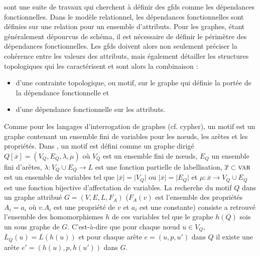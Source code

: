 \cite{fanKeysGraphs2015,fanFunctionalDependenciesGraphs2016, fanDependenciesGraphs2019} sont une suite de travaux qui cherchent à définir des \glspl{gfd} comme les dépendances fonctionnelles.
Dans le modèle relationnel, les dépendances fonctionnelles sont définies sur une relation pour un ensemble d'attributs.
Pour les graphes, étant généralement dépourvus de schéma, il est nécessaire de définir le périmètre des dépendances fonctionnelles.
Les \glspl{gfd} doivent alors non seulement préciser la cohérence entre les valeurs des attributs, mais également détailler les structures topologiques qui les caractérisent et sont alors la combinaison :
\begin{itemize}
    \item d'une contrainte topologique, ou motif, sur le graphe qui définie la portée de la dépendance fonctionnelle et
    \item d'une dépendance fonctionnelle sur les attributs.
\end{itemize}

Comme pour les langages d'interrogation de graphes (cf. \gls{cypher}), un motif est un graphe contenant un ensemble fini de variables pour les nœuds, les arêtes et les propriétés.
Dans \cite{fanDependenciesGraphs2019}, un motif est défini comme un graphe dirigé $Q[\overline{x}] = (V_Q, E_Q, \lambda, \mu)$ où $V_Q$ est un ensemble fini de nœuds, $E_Q$ un ensemble fini d'arêtes, $\lambda : V_Q \cup E_Q \to L$ est une fonction partielle de labellisation, $\overline{x} \subset \textsc{var}$ est un ensemble de variables tel que $\lvert \overline{x} \rvert = \lvert V_Q \rvert$ ou $\lvert \overline{x} \rvert = \lvert E_Q \rvert$ et $\mu : \overline{x} \to V_Q \cup E_Q$ est une fonction bijective d'affectation de variables.
La recherche du motif $Q$ dans un graphe attribué $G = (V, E, L, F_A)$ ($F_A(v)$ est l'ensemble des propriétés $A_i = a_i$ où $v.A_i$ est une propriété de $v$ et $a_i$ est une constante) consiste a retrouvé l'ensemble des homomorphismes $h$ de ces variables tel que le graphe $h(Q)$ sois un sous graphe de $G$.
C'est-à-dire que pour chaque nœud $u \in V_Q$, $L_Q(u) = L(h(u))$ et pour chaque arête $e = (u, p, u')$ dans $Q$ il existe une arête $e' = (h(u), p, h(u'))$ dans $G$.

